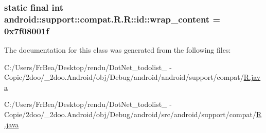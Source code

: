 \hypertarget{classandroid_1_1support_1_1compat_1_1_r_1_1id_84173802a13e5794b6454985096834ea}{
\subsubsection[{wrap\_\-content}]{\setlength{\rightskip}{0pt plus 5cm}static final int android::support::compat.R.R::id::wrap\_\-content = 0x7f08001f}}
\label{classandroid_1_1support_1_1compat_1_1_r_1_1id_84173802a13e5794b6454985096834ea}




The documentation for this class was generated from the following files:\begin{CompactItemize}
\item 
C:/Users/FrBea/Desktop/rendu/DotNet\_\-todolist\_ - Copie/2doo/\_\-2doo.Android/obj/Debug/android/android/support/compat/\hyperlink{android_2support_2compat_2_r_8java}{R.java}\item 
C:/Users/FrBea/Desktop/rendu/DotNet\_\-todolist\_ - Copie/2doo/\_\-2doo.Android/obj/Debug/android/src/android/support/compat/\hyperlink{src_2android_2support_2compat_2_r_8java}{R.java}\end{CompactItemize}
